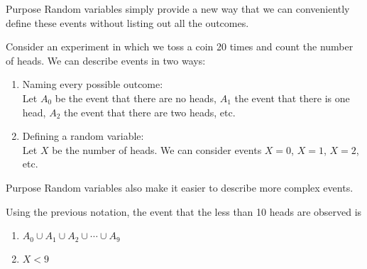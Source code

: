 \documentclass[aspectratio=169,xcolor=pdftex,dvipsnames,table]{beamer}\usepackage[]{graphicx}\usepackage[]{xcolor}
\begin{document}
\begin{frame}

  \begin{block}{Purpose}
  Random variables simply provide a new way that we can conveniently define these events without listing out all the outcomes.

  \medskip

  Consider an experiment in which we toss a coin 20 times and count the number of heads. We can describe events in two ways:
  \begin{enumerate}[1)]
  \item Naming every possible outcome:\\
  Let $A_0$ be the event that there are no heads, $A_1$ the event that there is one head, $A_2$ the event that there are two heads, etc.
  \item Defining a random variable:\\
  Let $X$ be the number of heads. We can consider events $X=0$, $X=1$, $X=2$, etc.
  \end{enumerate}
  \end{block}
\end{frame}

\begin{frame}

  \begin{block}{Purpose}
  Random variables also make it easier to describe more complex events. 
  
  \medskip
  
  Using the previous notation, the event that the less than 10 heads are observed is
  \begin{enumerate}[1)]
  \item $A_0 \cup A_1 \cup A_2 \cup \cdots \cup A_{9}$
  \item $X<9$
  \end{enumerate}
  \end{block}
\end{frame}
  
\end{document}
